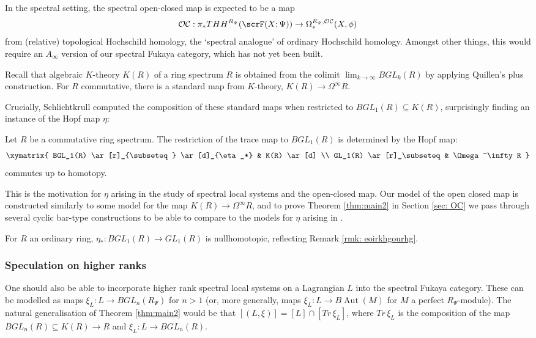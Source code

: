 \documentclass{TPmod}
\DeclareMathOperator{\Aut}{Aut}
\newcommand{\cC}{\mathcal{C}}
\newcommand{\cO}{\mathcal{O}}
\numberwithin{equation}{section}
\begin{document}
    In the spectral setting, the spectral open-closed map is expected to be a map  \[
    \cO\cC: \pi_*THH^{R_\Psi}(\scrF(X; \Psi)) \to \Omega^{E_\Psi, \cO\cC}_*(X, \phi)\]
    from (relative) topological Hochschild homology, the `spectral analogue' of ordinary Hochschild homology. 
    Amongst other things, this would require an $A_\infty$ version of our spectral Fukaya category, which has not yet been built. 

    Recall that algebraic $K$-theory $K(R)$ of a ring spectrum $R$ is obtained from the colimit $\lim_{k \to \infty} BGL_k(R)$ by applying Quillen's plus construction. For $R$ commutative, there is a standard map from $K$-theory, $K(R) \to \Omega^\infty R$. 
    
    Crucially, Schlichtkrull computed the composition of these standard maps when restricted to $BGL_1(R) \subseteq K(R)$, surprisingly finding an instance of the Hopf map $\eta$:
    \begin{thm}\label{thm:Schlichtkrull}
        Let $R$ be a commutative ring spectrum. The restriction of the trace map to $BGL_1(R)$ is determined by the Hopf map:
        \begin{equation}
            \xymatrix{
                BGL_1(R) 
                \ar[r]_{\subseteq}
                \ar[d]_{\eta_*} 
                &
                K(R)
                \ar[d]
                \\
                GL_1(R)
                \ar[r]_\subseteq
                &
                \Omega^\infty R
            }
        \end{equation}
        commutes up to homotopy.
    \end{thm}

    This is the motivation for $\eta$ arising in the study of spectral local systems and the open-closed map. Our model of the open closed map is constructed similarly to some model for the map $K(R) \to \Omega^\infty R$, and to prove Theorem \ref{thm:main2} in Section \ref{sec: OC} we pass through several cyclic bar-type constructions to be able to compare to the models for $\eta$ arising in \cite{Schlichtkrull}. 


    \begin{rmk}
        For $R$ an ordinary ring, $\eta_*: BGL_1(R) \to GL_1(R)$ is nullhomotopic, reflecting Remark \ref{rmk: eoirkhgourhg}.
    \end{rmk}

\subsubsection*{Speculation on higher ranks}
    One should also be able to incorporate higher rank spectral local systems on a Lagrangian $L$ into the spectral Fukaya category. These can be modelled as maps $\xi_L: L \to BGL_n(R_\Psi)$ for $n > 1$ (or, more generally, maps $\xi_L: L \to B\Aut(M)$ for $M$ a perfect $R_\Psi$-module). The natural generalisation of Theorem \ref{thm:main2} would be that $[(L, \xi)] = [L] \cap [Tr\,\xi_L]$, where $Tr \,\xi_L$ is the composition of the map $BGL_n(R) \subseteq K(R) \to R$ and $\xi_L: L \to BGL_n(R)$. 
\end{document}
